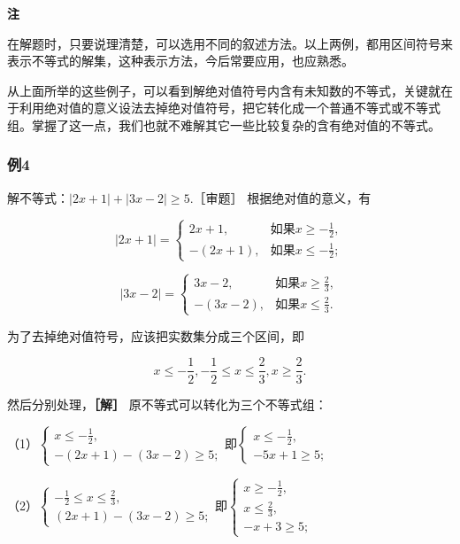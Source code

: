 \textbf{注}

在解题时，只要说理清楚，可以选用不同的叙述方法。以上两例，都用区间符号来表示不等式的解集，这种表示方法，今后常要应用，也应熟悉。

从上面所举的这些例子，可以看到解绝对值符号内含有未知数的不等式，关键就在于利用绝对值的意义设法去掉绝对值符号，把它转化成一个普通不等式或不等式组。掌握了这一点，我们也就不难解其它一些比较复杂的含有绝对值的不等式。

\subsubsection{例4}

解不等式：\(|2x + 1| + |3x - 2|\geqslant 5.\)［审题］
根据绝对值的意义，有

\[
\left| 2 x + 1 \right| = \left\{ \begin{array}{ll} 2 x + 1, & \text{如果} x \geqslant - \frac{1}{2}, \\ - (2 x + 1), & \text{如果} x \leqslant - \frac{1}{2}; \end{array} \right.
\]

\[
\left| 3 x - 2 \right| = \left\{ \begin{array}{ll} 3 x - 2, & \text{如果} x \geqslant \frac{2}{3}, \\ - (3 x - 2), & \text{如果} x \leqslant \frac{2}{3}. \end{array} \right.
\]

为了去掉绝对值符号，应该把实数集分成三个区间，即

\[
x \leqslant - \frac{1}{2}, - \frac{1}{2} \leqslant x \leqslant \frac{2}{3}, x \geqslant \frac{2}{3}.
\]

然后分别处理，\textbf{［解］} 原不等式可以转化为三个不等式组：

（1）\(\left\{ \begin{array}{l} x \leqslant -\frac{1}{2}, \\ -(2x + 1) - (3x - 2) \geqslant 5; \end{array} \right.\)即\(\left\{ \begin{array}{l} x \leqslant -\frac{1}{2}, \\ -5x + 1 \geqslant 5; \end{array} \right.\)

（2）\(\left\{ \begin{array}{l} -\frac{1}{2} \leqslant x \leqslant \frac{2}{3}, \\ (2x + 1) - (3x - 2) \geqslant 5; \end{array} \right.\)即\(\left\{ \begin{array}{l} x \geqslant -\frac{1}{2}, \\ x \leqslant \frac{2}{3}, \\ -x + 3 \geqslant 5; \end{array} \right.\)

